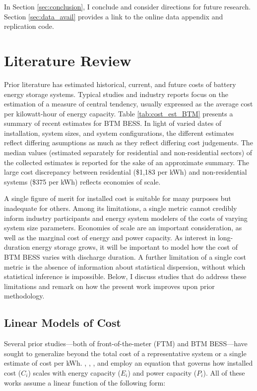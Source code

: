 \documentclass[preprint,12pt,authoryear]{elsarticle}
\begin{document}
 In Section \ref{sec:conclusion}, I conclude and consider directions for future research. Section \ref{sec:data_avail} provides a link to the online data appendix and replication code.

\section{Literature Review}\label{sec:lit_review}

Prior literature has estimated historical, current, and future costs of battery energy storage systems. Typical studies and industry reports focus on the estimation of a measure of central tendency, usually expressed as the average cost per kilowatt-hour of energy capacity. Table \ref{tab:cost_est_BTM} presents a summary of recent estimates for BTM BESS. In light of varied dates of installation, system sizes, and system configurations, the different estimates reflect differing asumptions as much as they reflect differing cost judgements. The median values (estimated separately for residential and non-residential sectors) of the collected estimates is reported for the sake of an approximate summary. The large cost discrepancy between residential (\$1,183 per kWh) and non-residential systems (\$375 per kWh) reflects economies of scale.

A single figure of merit for installed cost is suitable for many purposes but inadequate for others. Among its limitations, a single metric cannot credibly inform industry participants and energy system modelers of the costs of varying system size parameters. Economies of scale are an important consideration, as well as the marginal cost of energy and power capacity. As interest in long-duration energy storage grows, it will be important to model how the cost of BTM BESS varies with discharge duration. A further limitation of a single cost metric is the absence of information about statistical dispersion, without which statistical inference is impossible. Below, I discuss studies that do address these limitations and remark on how the present work improves upon prior methodology.

\subsection{Linear Models of Cost}\label{sec:linear_lit}

Several prior studies---both of front-of-the-meter (FTM) and BTM BESS---have sought to generalize beyond the total cost of a representative system or a single estimate of cost per kWh. \citet{dietrich2018}, \citet{schmidt2019}, \citet{comello2019}, and \citet{augustineblair2021} employ an equation that governs how installed cost ($C_i$) scales with energy capacity ($E_i$) and power capacity ($P_i$). All of these works assume a linear function of the following form:
\end{document}
